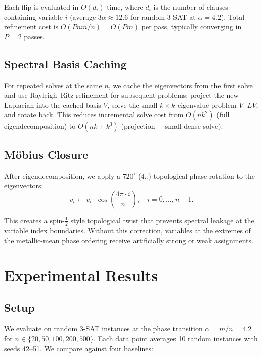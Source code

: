 \documentclass[11pt,a4paper]{article}
\begin{document}
Each flip is evaluated in $O(d_i)$ time, where $d_i$ is the number of
clauses containing variable $i$ (average $3\alpha \approx 12.6$ for
random 3-SAT at $\alpha = 4.2$). Total refinement cost is $O(Pnm/n) =
O(Pm)$ per pass, typically converging in $P = 2$ passes.

\subsection{Spectral Basis Caching}

For repeated solves at the same $n$, we cache the eigenvectors from the
first solve and use Rayleigh--Ritz refinement for subsequent problems:
project the new Laplacian into the cached basis $V$, solve the small
$k \times k$ eigenvalue problem $V^\top L V$, and rotate back. This
reduces incremental solve cost from $O(nk^2)$ (full eigendecomposition)
to $O(nk + k^3)$ (projection + small dense solve).

\subsection{M\"obius Closure}

After eigendecomposition, we apply a $720^\circ$ ($4\pi$) topological
phase rotation to the eigenvectors:
\begin{equation}
v_i \leftarrow v_i \cdot \cos\left(\frac{4\pi \cdot i}{n}\right),
\quad i = 0, \ldots, n-1.
\end{equation}

This creates a spin-$\frac{1}{2}$ style topological twist that
prevents spectral leakage at the variable index boundaries. Without
this correction, variables at the extremes of the metallic-mean phase
ordering receive artificially strong or weak assignments.

\section{Experimental Results}

\subsection{Setup}

We evaluate on random 3-SAT instances at the phase transition
$\alpha = m/n = 4.2$ for $n \in \{20, 50, 100, 200, 500\}$. Each
data point averages 10 random instances with seeds 42--51. We compare
against four baselines:
\end{document}
